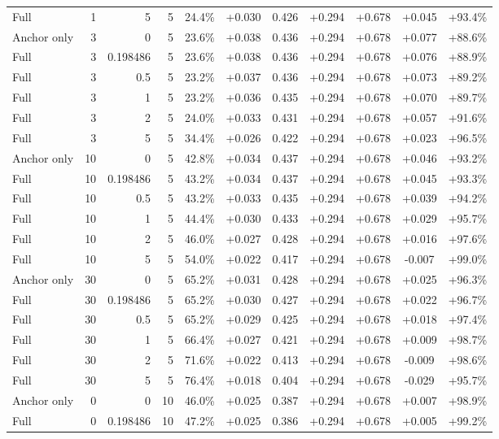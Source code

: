 \begin{table}[htbp]
\begin{tabular}{lrrrccccccc}
Full & 1 & 5 & 5 & 24.4\% & +0.030 & 0.426 & +0.294 & +0.678 & +0.045 & +93.4\% \\
Anchor only & 3 & 0 & 5 & 23.6\% & +0.038 & 0.436 & +0.294 & +0.678 & +0.077 & +88.6\% \\
Full & 3 & 0.198486 & 5 & 23.6\% & +0.038 & 0.436 & +0.294 & +0.678 & +0.076 & +88.9\% \\
Full & 3 & 0.5 & 5 & 23.2\% & +0.037 & 0.436 & +0.294 & +0.678 & +0.073 & +89.2\% \\
Full & 3 & 1 & 5 & 23.2\% & +0.036 & 0.435 & +0.294 & +0.678 & +0.070 & +89.7\% \\
Full & 3 & 2 & 5 & 24.0\% & +0.033 & 0.431 & +0.294 & +0.678 & +0.057 & +91.6\% \\
Full & 3 & 5 & 5 & 34.4\% & +0.026 & 0.422 & +0.294 & +0.678 & +0.023 & +96.5\% \\
Anchor only & 10 & 0 & 5 & 42.8\% & +0.034 & 0.437 & +0.294 & +0.678 & +0.046 & +93.2\% \\
Full & 10 & 0.198486 & 5 & 43.2\% & +0.034 & 0.437 & +0.294 & +0.678 & +0.045 & +93.3\% \\
Full & 10 & 0.5 & 5 & 43.2\% & +0.033 & 0.435 & +0.294 & +0.678 & +0.039 & +94.2\% \\
Full & 10 & 1 & 5 & 44.4\% & +0.030 & 0.433 & +0.294 & +0.678 & +0.029 & +95.7\% \\
Full & 10 & 2 & 5 & 46.0\% & +0.027 & 0.428 & +0.294 & +0.678 & +0.016 & +97.6\% \\
Full & 10 & 5 & 5 & 54.0\% & +0.022 & 0.417 & +0.294 & +0.678 & -0.007 & +99.0\% \\
Anchor only & 30 & 0 & 5 & 65.2\% & +0.031 & 0.428 & +0.294 & +0.678 & +0.025 & +96.3\% \\
Full & 30 & 0.198486 & 5 & 65.2\% & +0.030 & 0.427 & +0.294 & +0.678 & +0.022 & +96.7\% \\
Full & 30 & 0.5 & 5 & 65.2\% & +0.029 & 0.425 & +0.294 & +0.678 & +0.018 & +97.4\% \\
Full & 30 & 1 & 5 & 66.4\% & +0.027 & 0.421 & +0.294 & +0.678 & +0.009 & +98.7\% \\
Full & 30 & 2 & 5 & 71.6\% & +0.022 & 0.413 & +0.294 & +0.678 & -0.009 & +98.6\% \\
Full & 30 & 5 & 5 & 76.4\% & +0.018 & 0.404 & +0.294 & +0.678 & -0.029 & +95.7\% \\
Anchor only & 0 & 0 & 10 & 46.0\% & +0.025 & 0.387 & +0.294 & +0.678 & +0.007 & +98.9\% \\
Full & 0 & 0.198486 & 10 & 47.2\% & +0.025 & 0.386 & +0.294 & +0.678 & +0.005 & +99.2\% \\

\end{tabular}
\end{table}
